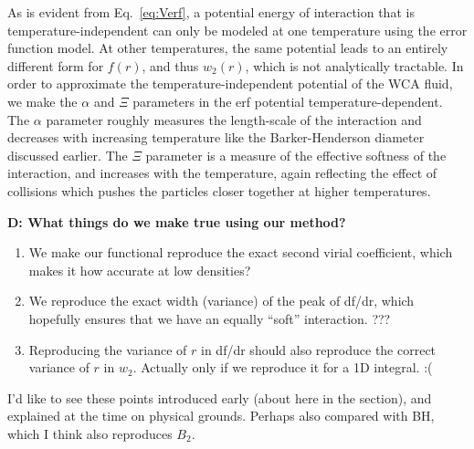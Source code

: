 \documentclass[letterpaper,twocolumn,amsmath,amssymb,prb]{revtex4-1}
\newcommand\davidsays[1]{{\bf \color{blue}D: #1}}
\begin{document}


As is evident from Eq.~\ref{eq:Verf}, a potential energy of interaction 
that is temperature-independent can only be modeled at one temperature 
using the error function model.
At other temperatures, the same potential leads
to an entirely different form for $f(r)$, and thus $w_2(r)$, which is not
analytically tractable. 
In order to approximate the temperature-independent potential of the WCA 
fluid, we make the $\alpha$ and $\Xi$ parameters in the erf potential 
temperature-dependent.
The $\alpha$ parameter roughly measures the length-scale of the
interaction and decreases with increasing temperature 
like the Barker-Henderson diameter 
discussed earlier. 
The $\Xi$ parameter is a measure of the effective softness of the 
interaction, and increases with the temperature, again reflecting the
effect of collisions which pushes the particles
closer together at higher temperatures.


\davidsays{What things do we make true using our method?
\begin{enumerate}
\item We make our functional reproduce the exact second virial coefficient,
  which makes it how accurate at low densities?
\item We reproduce the exact width (variance) of the peak of df/dr, which
  hopefully ensures that we have an equally ``soft'' interaction. ???
\item Reproducing the variance of $r$ in df/dr should also reproduce the correct
variance of $r$ in $w_2$.  Actually only if we reproduce it for a 1D integral.
:(
\end{enumerate}
I'd like to see these points introduced early (about here in the section), and
explained at the time on physical grounds.  Perhaps also compared with BH, which
I think also reproduces $B_2$.
}
\end{document}
